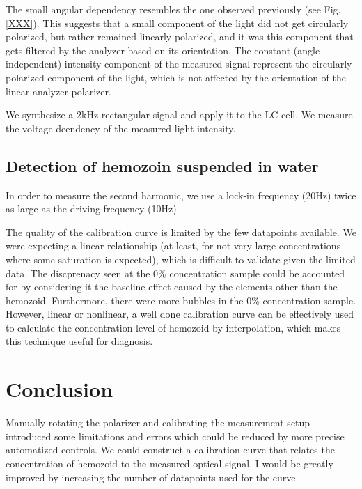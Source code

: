 \documentclass[12pt,a4paper]{article}
\begin{document}
 The small angular dependency resembles the one observed previously (see Fig. \ref{XXX}). This suggests that a small component of the light did not get circularly polarized, but rather remained linearly polarized, and it was this component that gets filtered by the analyzer based on its orientation.
 The constant (angle independent) intensity component of the measured signal represent the circularly polarized component of the light, which is not affected by the orientation of the linear analyzer polarizer.



We synthesize a 2kHz rectangular signal and apply it to the LC cell. We measure the voltage deendency of the measured light intensity. 







\subsection{Detection of hemozoin suspended in water}


In order to measure the second harmonic, we use a lock-in frequency (20Hz) twice as large as the driving frequency (10Hz)


The quality of the calibration curve is limited by the few datapoints available. We were expecting a linear relationship (at least, for not very large concentrations where some saturation is expected), which is difficult to validate given the limited data. The discprenacy seen at the 0\% concentration sample could be accounted for by considering it the baseline effect caused by the elements other than the hemozoid. %
Furthermore, there were more bubbles in the 0\% concentration sample. However, linear or nonlinear, a well done calibration curve can be effectively used to calculate the concentration level of hemozoid by interpolation, which makes this technique useful for diagnosis.


\section{Conclusion}

Manually rotating the polarizer and calibrating the measurement setup introduced some limitations and errors which could be reduced by more precise automatized controls.
We could construct a calibration curve that relates the concentration of hemozoid to the measured optical signal. I would be greatly improved by increasing the number of datapoints used for the curve.
\end{document}
